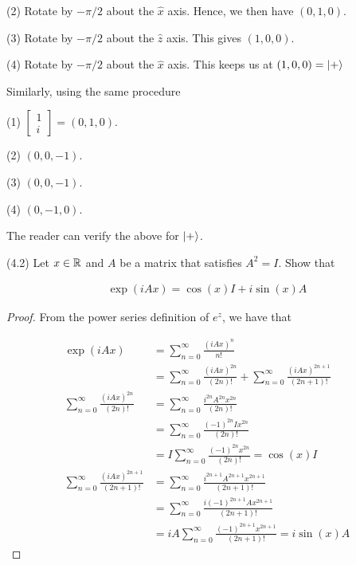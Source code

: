 \documentclass[main.tex]{subfiles}
\begin{document}
\begin{subappendices}
(2) Rotate by $- \pi / 2$ about the $\hat{x}$ axis. Hence, we then have $(0, 1,0)$.

(3) Rotate by $- \pi / 2$ about the $\hat{z}$ axis. This gives $(1, 0, 0)$.

(4) Rotate by $- \pi / 2$ about the $\hat{x}$ axis. This keeps us at $(1, 0, 0) = \ket{+}$

Similarly, using the same procedure

(1) $\begin{bmatrix} 1 \\ i \end{bmatrix} = (0, 1, 0)$.

(2) $(0, 0 , -1)$.

(3) $(0, 0, -1)$.

(4) $(0, -1, 0)$.

The reader can verify the above for $\ket{+}$. 

\begin{exercise} (4.2) Let $x \in \mathbb{R}$ and $A$ be a matrix that satisfies $A^2 = I$. Show that 

\begin{align*}
\exp(i A x) = \cos(x) I + i \sin(x) A	
\end{align*}
 
\begin{proof}

From the power series definition of $e^{z}$, we have that
	
	\begin{align*}
		\exp(i A x) &=  \sum_{n=0}^\infty \frac{(iAx)^n}{n!} \\
		&= \sum_{n=0}^\infty \frac{(iAx)^{2n}}{(2n)!} + \sum_{n=0}^\infty \frac{(iAx)^{2n+1}}{(2n+1)!} \\
		\sum_{n=0}^\infty \frac{(iAx)^{2n}}{(2n)!} &= \sum_{n=0}^\infty \frac{i^{2n}A^{2n}x^{2n}}{(2n)!} \\
		&= \sum_{n=0}^\infty \frac{(-1)^{2n} I x^{2n}}{(2n)!} \\
		&= I \sum_{n=0}^\infty \frac{(-1)^{2n}  x^{2n}}{(2n)!} = \cos(x)I \\
		\sum_{n=0}^\infty \frac{(iAx)^{2n+1}}{(2n+1)!} &= \sum_{n=0}^\infty \frac{i^{2n+1}A^{2n+1}x^{2n+1}}{(2n+1)!} \\
		&= \sum_{n=0}^\infty \frac{i(-1)^{2n+1}Ax^{2n+1}}{(2n+1)!} \\
		&= iA \sum_{n=0}^\infty \frac{(-1)^{2n+1}x^{2n+1}}{(2n+1)!} = i\sin(x) A
	\end{align*}

\end{proof}
\end{exercise}


\end{subappendices}
\end{document}
